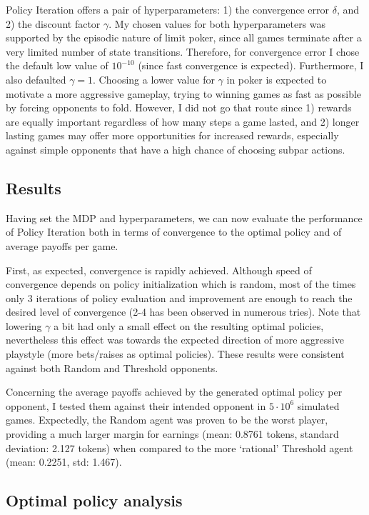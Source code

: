 Policy Iteration offers a pair of hyperparameters: 1) the convergence error $\delta$, and 2) the discount factor $\gamma$. My chosen values for both hyperparameters was supported by the episodic nature of limit poker, since all games terminate after a very limited number of state transitions. Therefore, for convergence error I chose the default low value of $10^{-10}$ (since fast convergence is expected). Furthermore, I also defaulted $\gamma=1$. Choosing a lower value for $\gamma$ in poker is expected to motivate a more aggressive gameplay, trying to winning games as fast as possible by forcing opponents to fold. However, I did not go that route since 1) rewards are equally important regardless of how many steps a game lasted, and 2) longer lasting games may offer more opportunities for increased rewards, especially against simple opponents that have a high chance of choosing subpar actions.

\subsection{Results}

Having set the MDP and hyperparameters, we can now evaluate the performance of Policy Iteration both in terms of convergence to the optimal policy and of average payoffs per game.

First, as expected, convergence is rapidly achieved. Although speed of convergence depends on policy initialization which is random, most of the times only 3 iterations of policy evaluation and improvement are enough to reach the desired level of convergence (2-4 has been observed in numerous tries). Note that lowering $\gamma$ a bit had only a small effect on the resulting optimal policies, nevertheless this effect was towards the expected direction of more aggressive playstyle (more bets/raises as optimal policies). These results were consistent against both Random and Threshold opponents.

Concerning the average payoffs achieved by the generated optimal policy per opponent, I tested them against their intended opponent in $5\cdot10^6$ simulated games. Expectedly, the Random agent was proven to be the worst player, providing a much larger margin for earnings (mean: 0.8761 tokens, standard deviation: 2.127 tokens) when compared to the more `rational' Threshold agent (mean: 0.2251, std: 1.467). 

\subsection{Optimal policy analysis}

